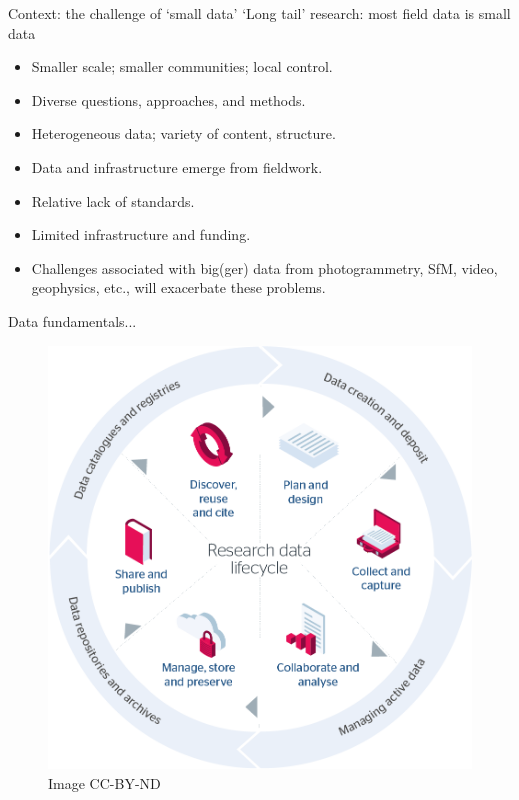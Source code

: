 \documentclass[aspectratio=169, 11pt]{beamer} %
\begin{document}
\begin{frame}{Context: the challenge of `small data'}
    `Long tail' research: most field data is small data \cite{Borgman2015-rh}
    \begin{itemize}[label=\textbullet]
        \item Smaller scale; smaller communities; local control.
        \item Diverse questions, approaches, and methods.
        \item Heterogeneous data; variety of content, structure.
        \item Data and infrastructure emerge from fieldwork. 
        \item Relative lack of standards.
        \item Limited infrastructure and funding.
        \item Challenges associated with big(ger) data from photogrammetry, SfM, video, geophysics, etc., will exacerbate these problems.
    \end{itemize}
\end{frame}

\begin{frame}{Data fundamentals...}
 \begin{figure}[H]
    \centering
        \includegraphics[height=.75\textheight]{figures/research-data-life-diagram.png}
        \caption{\cite{Jisc2018-gx} Image CC-BY-ND}
        \label{fig:figure9}
 \end{figure}
\end{frame}
\end{document}
